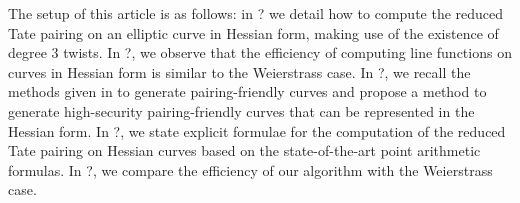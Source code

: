 The setup of this article is as follows: in ? we detail how to compute the reduced Tate pairing on an elliptic curve in Hessian form, making use of the existence of degree 3 twists.
In ?, we observe that the efficiency of computing line functions on curves in Hessian form is similar to the Weierstrass case.
In ?, we recall the methods given in \cite{2010/freeman} to generate pairing-friendly curves
and propose a method to generate high-security pairing-friendly curves
that can be represented in the Hessian form.
In ?, we state explicit formulae for the computation of the reduced Tate pairing on Hessian curves based on the state-of-the-art point arithmetic formulas. In ?, we compare the efficiency of our algorithm with the Weierstrass case.



%
%

%
